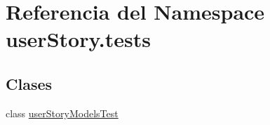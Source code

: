 \hypertarget{namespaceuser_story_1_1tests}{}\section{Referencia del Namespace user\+Story.\+tests}
\label{namespaceuser_story_1_1tests}
\subsection*{Clases}
\begin{DoxyCompactItemize}
\item 
class \hyperlink{classuser_story_1_1tests_1_1user_story_models_test}{user\+Story\+Models\+Test}
\end{DoxyCompactItemize}
